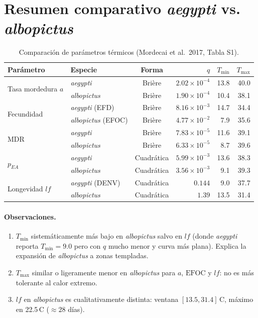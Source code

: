 \documentclass[11pt,a4paper]{article}
\begin{document}
\section{Resumen comparativo \textit{aegypti} vs. \textit{albopictus}}

\begin{table}[h!]
\centering
\caption{Comparaci\'on de par\'ametros t\'ermicos (Mordecai et al.\ 2017, Tabla S1).}
\small
\begin{tabular}{llcrrr}
\toprule
Par\'ametro & Especie & Forma & $q$ & $T_{\min}$ & $T_{\max}$ \\
\midrule
\multirow{2}{*}{Tasa mordedura $a$}
  & \textit{aegypti}    & Bri\`ere & $2.02\!\times\!10^{-4}$ & 13.8 & 40.0 \\
  & \textit{albopictus} & Bri\`ere & $1.90\!\times\!10^{-4}$ & 10.4 & 38.1 \\
\midrule
\multirow{2}{*}{Fecundidad}
  & \textit{aegypti} (EFD)     & Bri\`ere & $8.16\!\times\!10^{-3}$ & 14.7 & 34.4 \\
  & \textit{albopictus} (EFOC) & Bri\`ere & $4.77\!\times\!10^{-2}$ &  7.9 & 35.6 \\
\midrule
\multirow{2}{*}{MDR}
  & \textit{aegypti}    & Bri\`ere & $7.83\!\times\!10^{-5}$ & 11.6 & 39.1 \\
  & \textit{albopictus} & Bri\`ere & $6.33\!\times\!10^{-5}$ &  8.7 & 39.6 \\
\midrule
\multirow{2}{*}{$p_{EA}$}
  & \textit{aegypti}    & Cuadr\'atica & $5.99\!\times\!10^{-3}$ & 13.6 & 38.3 \\
  & \textit{albopictus} & Cuadr\'atica & $3.56\!\times\!10^{-3}$ &  9.1 & 39.3 \\
\midrule
\multirow{2}{*}{Longevidad $lf$}
  & \textit{aegypti} (DENV) & Cuadr\'atica & $0.144$ &  9.0 & 37.7 \\
  & \textit{albopictus}     & Cuadr\'atica & $1.39$  & 13.5 & 31.4 \\
\bottomrule
\end{tabular}
\end{table}

\paragraph{Observaciones.}
\begin{enumerate}
  \item $T_{\min}$ sistem\'aticamente m\'as bajo en \textit{albopictus} salvo en
        $lf$ (donde \textit{aegypti} reporta $T_{\min} = 9.0$ pero con $q$ mucho
        menor y curva m\'as plana). Explica la expansi\'on de \textit{albopictus}
        a zonas templadas.
  \item $T_{\max}$ similar o ligeramente menor en \textit{albopictus} para $a$,
        $\mathrm{EFOC}$ y $lf$: no es m\'as tolerante al calor extremo.
  \item $lf$ en \textit{albopictus} es cualitativamente distinta: ventana
        $[13.5,31.4]$\,\textdegree C, m\'aximo en 22.5\,\textdegree C
        ($\approx 28$ d\'ias).
\end{enumerate}
\end{document}
